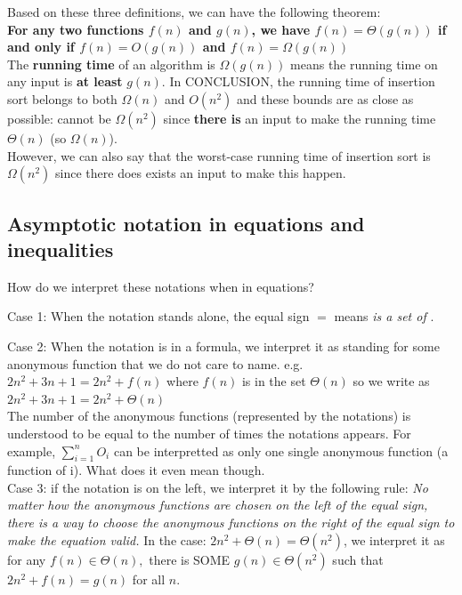 \documentclass{article}
\begin{document}
 Based on these three definitions, we can have the following theorem:\\
 {\color{blue}\small \textbf{For any two functions $f(n)$ and $g(n)$, we have $f(n) = \Theta(g(n))$ if and only if $f(n)= O(g(n))$ and $f(n) = \Omega(g(n))$}}\\
 
 The \textbf{running time} of an algorithm is $\Omega(g(n))$ means the running time on any input is \textbf{at least} $g(n)$. In CONCLUSION, the running time of insertion sort belongs to both $\Omega(n)$ and $O(n^2)$ and these bounds are as close as possible: cannot be $\Omega(n^2)$ since \textbf{there is} an input to make the running time $\Theta(n)$ (so $\Omega(n)$).\\
 
 However, we can also say that the worst-case running time of insertion sort is $\Omega(n^2)$ since there does exists an input to make this happen.
 
 
\subsection*{Asymptotic notation in equations and inequalities}
How do we interpret these notations when in equations?

Case 1: When the notation stands alone, the equal sign $=$ means \textit{is a set of }. 

Case 2: When the notation is in a formula, we interpret it as standing for some anonymous function that we do not care to name. e.g. $2n^2+3n+1 = 2n^2+f(n)$ where $f(n)$ is in the set $\Theta(n)$ so we write as $2n^2+3n+1 = 2n^2+\Theta(n)$\\

The number of the anonymous functions (represented by the notations) is understood to be equal to the number of times the notations appears. For example, $\sum_{i=1}^{n}O_i$ can be interpretted as only one single anonymous function (a function of i). {\color{red} What does it even mean though.}\\

Case 3: if the notation is on the left, we interpret it by the following rule:
\textit{No matter how the anonymous
functions are chosen on the left of the equal sign, there is a way to choose
the anonymous functions on the right of the equal sign to make the equation valid. } In the case: $2n^2 +\Theta(n) = \Theta(n^2)$, we interpret it as for any $f(n)\in \Theta(n), $ there is SOME $g(n) \in \Theta(n^2)$ such that $2n^2 +f(n) = g(n)$ for all $n$.
\end{document}
